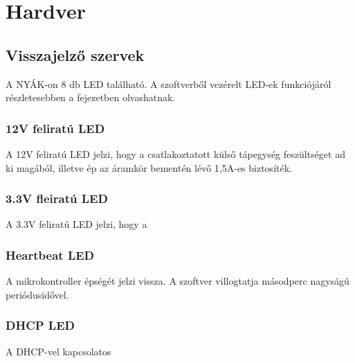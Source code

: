\chapter{Hardver}

\section{Visszajelző szervek}
A NYÁK-on 8 db LED található.
A szoftverből vezérelt LED-ek funkciójáról részletesebben a %
fejezetben olvashatnak.

\subsection{12V feliratú LED}
A 12V feliratú LED jelzi, hogy a csatlakoztatott külső tápegység feszültséget ad ki magából, illetve ép az áramkör bementén lévő 1,5A-es biztosíték.
\subsection{3.3V fleiratú LED}
A 3.3V feliratú LED jelzi, hogy a %

\subsection{Heartbeat LED}
A mikrokontroller épségét jelzi vissza. A szoftver villogtatja másodperc nagyságú periódusidővel.
\subsection{DHCP LED}
A DHCP-vel kapcsolatos 


